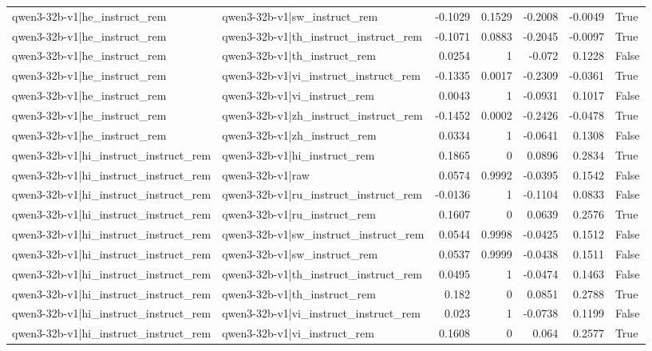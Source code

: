 \begin{table}
\begin{tabular}{l l r r r r l}
qwen3-32b-v1|he_instruct_rem & qwen3-32b-v1|sw_instruct_rem & -0.1029 & 0.1529 & -0.2008 & -0.0049 & True \\
qwen3-32b-v1|he_instruct_rem & qwen3-32b-v1|th_instruct_instruct_rem & -0.1071 & 0.0883 & -0.2045 & -0.0097 & True \\
qwen3-32b-v1|he_instruct_rem & qwen3-32b-v1|th_instruct_rem & 0.0254 & 1 & -0.072 & 0.1228 & False \\
qwen3-32b-v1|he_instruct_rem & qwen3-32b-v1|vi_instruct_instruct_rem & -0.1335 & 0.0017 & -0.2309 & -0.0361 & True \\
qwen3-32b-v1|he_instruct_rem & qwen3-32b-v1|vi_instruct_rem & 0.0043 & 1 & -0.0931 & 0.1017 & False \\
qwen3-32b-v1|he_instruct_rem & qwen3-32b-v1|zh_instruct_instruct_rem & -0.1452 & 0.0002 & -0.2426 & -0.0478 & True \\
qwen3-32b-v1|he_instruct_rem & qwen3-32b-v1|zh_instruct_rem & 0.0334 & 1 & -0.0641 & 0.1308 & False \\
qwen3-32b-v1|hi_instruct_instruct_rem & qwen3-32b-v1|hi_instruct_rem & 0.1865 & 0 & 0.0896 & 0.2834 & True \\
qwen3-32b-v1|hi_instruct_instruct_rem & qwen3-32b-v1|raw & 0.0574 & 0.9992 & -0.0395 & 0.1542 & False \\
qwen3-32b-v1|hi_instruct_instruct_rem & qwen3-32b-v1|ru_instruct_instruct_rem & -0.0136 & 1 & -0.1104 & 0.0833 & False \\
qwen3-32b-v1|hi_instruct_instruct_rem & qwen3-32b-v1|ru_instruct_rem & 0.1607 & 0 & 0.0639 & 0.2576 & True \\
qwen3-32b-v1|hi_instruct_instruct_rem & qwen3-32b-v1|sw_instruct_instruct_rem & 0.0544 & 0.9998 & -0.0425 & 0.1512 & False \\
qwen3-32b-v1|hi_instruct_instruct_rem & qwen3-32b-v1|sw_instruct_rem & 0.0537 & 0.9999 & -0.0438 & 0.1511 & False \\
qwen3-32b-v1|hi_instruct_instruct_rem & qwen3-32b-v1|th_instruct_instruct_rem & 0.0495 & 1 & -0.0474 & 0.1463 & False \\
qwen3-32b-v1|hi_instruct_instruct_rem & qwen3-32b-v1|th_instruct_rem & 0.182 & 0 & 0.0851 & 0.2788 & True \\
qwen3-32b-v1|hi_instruct_instruct_rem & qwen3-32b-v1|vi_instruct_instruct_rem & 0.023 & 1 & -0.0738 & 0.1199 & False \\
qwen3-32b-v1|hi_instruct_instruct_rem & qwen3-32b-v1|vi_instruct_rem & 0.1608 & 0 & 0.064 & 0.2577 & True \\

\end{tabular}
\end{table}

